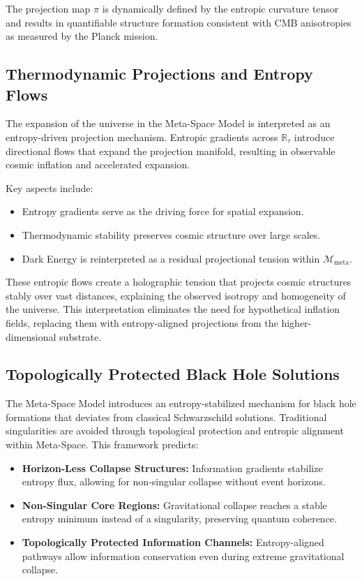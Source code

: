 \documentclass[10.5pt,a4paper]{article}
\begin{document}
The projection map \( \pi \) is dynamically defined by the entropic curvature tensor and 
results in quantifiable structure formation consistent with CMB anisotropies as measured by the Planck mission.

\subsection{Thermodynamic Projections and Entropy Flows}

The expansion of the universe in the Meta-Space Model is interpreted as an entropy-driven projection mechanism. 
Entropic gradients across \( \mathbb{R}_\tau \) introduce directional flows that expand the projection manifold, 
resulting in observable cosmic inflation and accelerated expansion.

Key aspects include:
\begin{itemize}
    \item Entropy gradients serve as the driving force for spatial expansion.
    \item Thermodynamic stability preserves cosmic structure over large scales.
    \item Dark Energy is reinterpreted as a residual projectional tension within \( \mathcal{M}_{\text{meta}} \).
\end{itemize}

These entropic flows create a holographic tension that projects cosmic structures stably over vast distances, 
explaining the observed isotropy and homogeneity of the universe. This interpretation eliminates the need for 
hypothetical inflation fields, replacing them with entropy-aligned projections from the higher-dimensional substrate.

\subsection{Topologically Protected Black Hole Solutions}

The Meta-Space Model introduces an entropy-stabilized mechanism for black hole formations that deviates from classical 
Schwarzschild solutions. Traditional singularities are avoided through topological protection and entropic alignment 
within Meta-Space. This framework predicts:
\begin{itemize}
    \item \textbf{Horizon-Less Collapse Structures:} Information gradients stabilize entropy flux, allowing for non-singular collapse without event horizons.
    \item \textbf{Non-Singular Core Regions:} Gravitational collapse reaches a stable entropy minimum instead of a singularity, preserving quantum coherence.
    \item \textbf{Topologically Protected Information Channels:} Entropy-aligned pathways allow information conservation even during extreme gravitational collapse.
\end{itemize}
\end{document}
